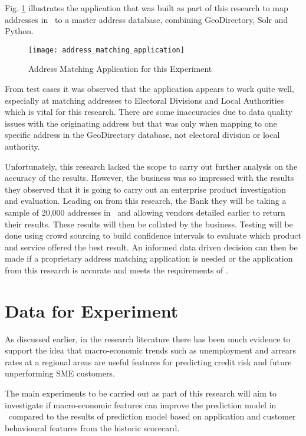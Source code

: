 Fig. \ref{fig:address_matching_application} illustrates the application that was built as part of this research to map addresses in \subjectname\ to a master address database, combining GeoDirectory, Solr and Python.

\begin{figure}[H]
	\texttt{[image: address\_matching\_application]}
	\caption{Address Matching Application for this Experiment}
	\label{fig:address_matching_application}
\end{figure}

From test cases it was observed that the application appears to work quite well, especially at matching addresses to Electoral Divisions and Local Authorities which is vital for this research. There are some inaccuracies due to data quality issues with the originating address but that was only when mapping to one specific address in the GeoDirectory database, not electoral division or local authority.

Unfortunately, this research lacked the scope to carry out further analysis on the accuracy of the results. However, the business was so impressed with the results they observed that it is going to carry out an enterprise product investigation and evaluation. Leading on from this research, the Bank they will be taking a sample of 20,000 addresses in \subjectname\ and allowing vendors detailed earlier to return their results. These results will then be collated by the business. Testing will be done using crowd sourcing to build confidence intervals to evaluate which product and service offered the best result. An informed data driven decision can then be made if a proprietary address matching application is needed or the application from this research is accurate and meets the requirements of \subjectname.  


\section{Data for Experiment}\label{sec:dataForExper}
As discussed earlier, in the research literature there has been much evidence to support the idea that macro-economic trends such as unemployment and arrears rates at a regional areas are useful features for predicting credit risk and future unperforming SME customers.

The main experiments to be carried out as part of this research will aim to investigate if macro-economic features can improve the prediction model in \subjectname\ compared to the results of prediction model based on application and customer behavioural features from the historic scorecard. 

